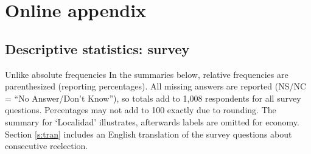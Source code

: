 \documentclass[letter,12pt]{article}
\begin{document}
\singlespacing




\newpage

\section{Online appendix}

\subsection{Descriptive statistics: survey}

Unlike absolute frequencies In the summaries below, relative frequencies are parenthesized (reporting percentages). All missing answers are reported (NS/NC = ``No Answer/Don't Know''), so totals add to 1,008 respondents for all survey questions. Percentages may not add to 100 exactly due to rounding. The summary for `Localidad' illustrates, afterwards labels are omitted for economy. Section \ref{s:tran} includes an English translation of the survey questions about consecutive reelection. 
\end{document}
